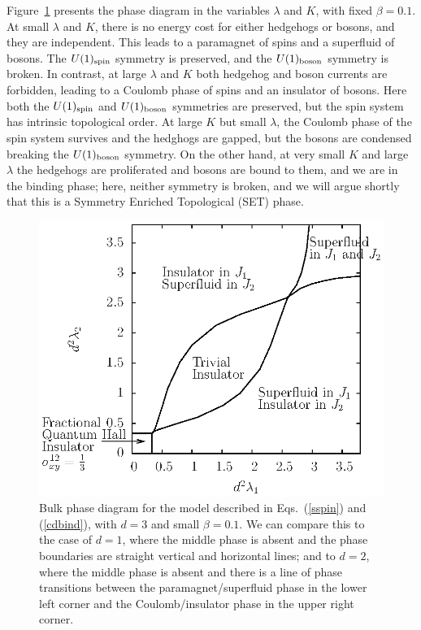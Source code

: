 Figure~\ref{fracphase} presents the phase diagram in the variables $\lambda$ and $K$, with fixed $\beta=0.1$.
At small $\lambda$ and $K$, there is no energy cost for either hedgehogs or bosons, and they are independent. This leads to a paramagnet of spins and a superfluid of bosons. The $U(1)_{\rm spin}$ symmetry is preserved, and the $U(1)_{\rm boson}$ symmetry is broken. In contrast, at large $\lambda$ and $K$ both hedgehog and boson currents are forbidden, leading to a Coulomb phase of spins and an insulator of bosons. Here both the $U(1)_{\rm spin}$ and $U(1)_{\rm boson}$ symmetries are preserved, but the spin system has intrinsic topological order. 
At large $K$ but small $\lambda$, the Coulomb phase of the spin system survives and the hedghogs are gapped, but the bosons are condensed breaking the $U(1)_{\rm boson}$ symmetry.
On the other hand, at very small $K$ and large $\lambda$ the hedgehogs are proliferated and bosons are bound to them, and we are in the binding phase; here, neither symmetry is broken, and we will argue shortly that this is a Symmetry Enriched Topological (SET) phase. 

\begin{figure}
\includegraphics[angle=-90,width=0.9\linewidth]{figures/fracphase.eps}
\caption{Bulk phase diagram for the model described in Eqs.~(\ref{sspin}) and (\ref{cdbind}), with $d=3$ and small $\beta=0.1$. We can compare this to the case of $d=1$, where the middle phase is absent and the phase boundaries are straight vertical and horizontal lines; and to $d=2$, where the middle phase is absent and there is a line of phase transitions between the paramagnet/superfluid phase in the lower left corner and the Coulomb/insulator phase in the upper right corner.}
\label{fracphase}
\end{figure}

